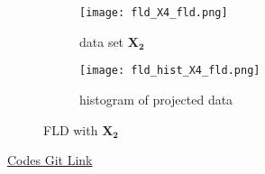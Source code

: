 \documentclass[11pt]{article}
\begin{document}
\begin{figure}[h]
\centering
\begin{subfigure}{0.3\textwidth}
\texttt{[image: fld\_X4\_fld.png]}
\caption{data set  $\bm{X_2}$}
\end{subfigure}
\begin{subfigure}{0.3\textwidth}
\texttt{[image: fld\_hist\_X4\_fld.png]}
\caption{histogram of projected data}
\end{subfigure}
\caption{FLD with $\bm{X_2}$ }
\label{fig:f4}
\end{figure}

\href{https://github.com/pipipiapia/machine_learing_foundation/blob/main/lab_1/FisherLinearDiscriminant.ipynb}{Codes Git Link}
\end{document}
